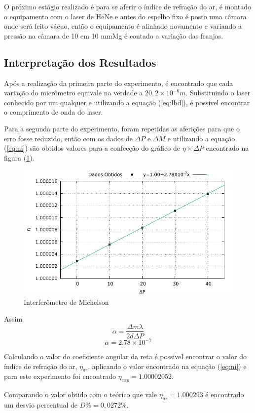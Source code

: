 O próximo estágio realizado é para se aferir o índice de refração do ar, é montado o equipamento com o laser de HeNe e antes do espelho fixo é posto uma câmara onde será feito vácuo, então o equipamento é alinhado novamento e variando a pressão na câmara de 10 em 10 mmMg é contado a variação das franjas. 	 
\subsection{Interpretação dos Resultados}
Após a realização da primeira parte do experimento, é encontrado que  cada variação do micrômetro equivale na verdade a $20,2 \times 10^{-6} m$. Substituindo o laser conhecido por um qualquer e utilizando a equação (\ref{eq:lbd}), é possivel encontrar o comprimento de onda do laser.

Para a segunda parte do experimento, foram repetidas as aferições para que o erro fosse reduzido, então com os dados de $\Delta P$ e $\Delta M$ e utilizando a equação (\ref{eq:ni}) são obtidos valores para a confecção do gráfico de $\eta \times \Delta P$ encontrado na figura (\ref{im:aa}).

 \begin{figure}[!h]
 	\centering
 		\includegraphics[scale= 1]{grafico/ar.pdf}
 	\caption{Interferômetro de Michelson}
 	\label{im:aa}
 \end{figure}

Assim 
\begin{equation*}
\alpha = \frac{\Delta m\lambda}{2d\Delta P}
\end{equation*}
\begin{equation*}
\alpha = 2.78\times 10^{-7}
\end{equation*}

Calculando o valor do coeficiente angular da reta é possivel encontrar o valor do índice de refração do ar, $\eta_{ar}$, aplicando o valor encontrado na equação (\ref{eq:ni}) e para este experimento foi encontrado $\eta_{exp} = 1.00002052$.

Comparando o valor obtido com o teórico que vale $\eta_{ar} = 1.000293$ é encontrado um desvio percentual de $D\% = 0,0272\%$.
